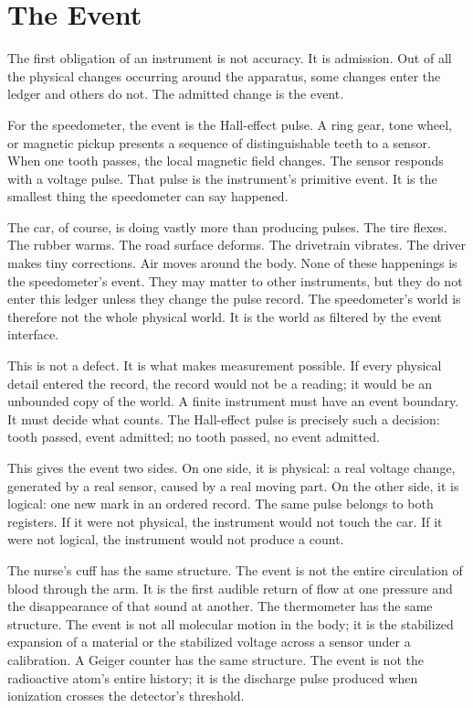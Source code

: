 
\section{The Event}
\label{se:the-event}

The first obligation of an instrument is not accuracy. It is admission. Out of
all the physical changes occurring around the apparatus, some changes enter the
ledger and others do not. The admitted change is the event.

For the speedometer, the event is the Hall-effect pulse. A ring gear, tone
wheel, or magnetic pickup presents a sequence of distinguishable teeth to a
sensor. When one tooth passes, the local magnetic field changes. The sensor
responds with a voltage pulse. That pulse is the instrument's primitive event.
It is the smallest thing the speedometer can say happened.

The car, of course, is doing vastly more than producing pulses. The tire flexes.
The rubber warms. The road surface deforms. The drivetrain vibrates. The driver
makes tiny corrections. Air moves around the body. None of these happenings is
the speedometer's event. They may matter to other instruments, but they do not
enter this ledger unless they change the pulse record. The speedometer's world
is therefore not the whole physical world. It is the world as filtered by the
event interface.

This is not a defect. It is what makes measurement possible. If every physical
detail entered the record, the record would not be a reading; it would be an
unbounded copy of the world. A finite instrument must have an event boundary. It
must decide what counts. The Hall-effect pulse is precisely such a decision:
tooth passed, event admitted; no tooth passed, no event admitted.

This gives the event two sides. On one side, it is physical: a real voltage
change, generated by a real sensor, caused by a real moving part. On the other
side, it is logical: one new mark in an ordered record. The same pulse belongs
to both registers. If it were not physical, the instrument would not touch the
car. If it were not logical, the instrument would not produce a count.

The nurse's cuff has the same structure. The event is not the entire circulation
of blood through the arm. It is the first audible return of flow at one pressure
and the disappearance of that sound at another. The thermometer has the same
structure. The event is not all molecular motion in the body; it is the
stabilized expansion of a material or the stabilized voltage across a sensor
under a calibration. A Geiger counter has the same structure. The event is not
the radioactive atom's entire history; it is the discharge pulse produced when
ionization crosses the detector's threshold.

